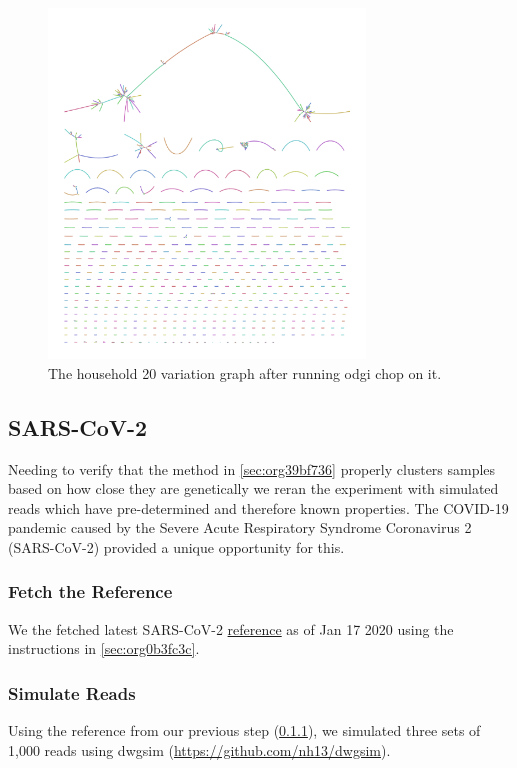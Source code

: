 \documentclass[10pt, a4paper]{article}
\begin{document}
\begin{figure}[h!]
\centering
\includegraphics[width=0.75\textwidth]{../Figures/RSV/Assembly_Bluntified.png}
\caption[RSV Variation Graph]{\label{fig:org29c02fc}
The household 20 variation graph after running odgi chop on it.}
\end{figure}

\clearpage
\subsection{SARS-CoV-2}
\label{sec:orgb4587b6}
Needing to verify that the method in \ref{sec:org39bf736} properly clusters samples based on 
how close they are genetically we reran the experiment with simulated reads
which have pre-determined and therefore known properties.
The COVID-19 pandemic caused by the Severe Acute Respiratory Syndrome
Coronavirus 2 (SARS-CoV-2) provided a unique opportunity for this. 

\subsubsection{Fetch the Reference}
\label{sec:org89d68d0}
We the fetched latest SARS-CoV-2 \href{https://www.ncbi.nlm.nih.gov/nuccore/1798174254}{reference} as of Jan 17 2020 using the instructions
in \ref{sec:org0b3fc3c}.

\subsubsection{Simulate Reads}
\label{sec:orgdac85f1}
Using the reference from our previous step (\ref{sec:org89d68d0}), we simulated 
three sets of 1,000 reads using dwgsim (\url{https://github.com/nh13/dwgsim}).
\end{document}
